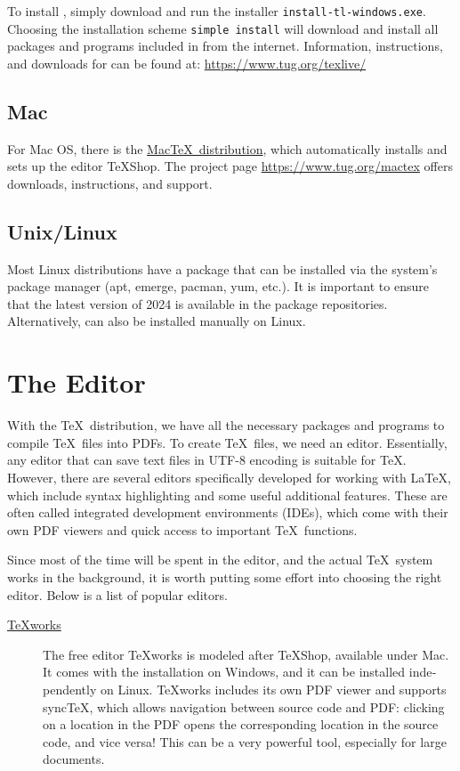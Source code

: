 \documentclass[
	ausgabe=2024-01-13,
	titel=Installation\ Instructions,
	shortverb=true,
	englisch=true,
]{../tex/latexkurs-exercise}
\begin{document}
\begin{english}
To install \TeXlive, simply download and run the installer \texttt{install-tl-windows.exe}. Choosing the installation scheme \texttt{simple install} will download and install all packages and programs included in \TeXlive from the internet. Information, instructions, and downloads for \TeXlive can be found at: \url{https://www.tug.org/texlive/}

\subsection*{Mac}
For Mac OS, there is the \href{https://www.tug.org/mactex}{Mac\TeX\ distribution}, which automatically installs \TeXlive and sets up the editor TeXShop. The project page \url{https://www.tug.org/mactex} offers downloads, instructions, and support.

\subsection*{Unix/Linux}
Most Linux distributions have a \TeXlive package that can be installed via the system's package manager (apt, emerge, pacman, yum, etc.). It is important to ensure that the latest version of 2024 is available in the package repositories. Alternatively, \TeXlive can also be installed manually on Linux.




\clearpage

\section{The Editor}

With the \TeX\ distribution, we have all the necessary packages and programs to compile \TeX\ files into PDFs. To create \TeX\ files, we need an editor. Essentially, any editor that can save text files in UTF-8 encoding is suitable for \TeX. However, there are several editors specifically developed for working with \LaTeX, which include syntax highlighting and some useful additional features. These are often called integrated development environments (IDEs), which come with their own PDF viewers and quick access to important \TeX\ functions.

Since most of the time will be spent in the editor, and the actual \TeX\ system works in the background, it is worth putting some effort into choosing the right editor. Below is a list of popular editors.

\begin{description}
\item[\href{https://www.tug.org/texworks/}{TeXworks}]
The free editor TeXworks is modeled after TeXShop, available under Mac. It comes with the \TeXlive installation on Windows, and it can be installed independently on Linux. TeXworks includes its own PDF viewer and supports sync\TeX, which allows navigation between source code and PDF: clicking on a location in the PDF opens the corresponding location in the source code, and vice versa! This can be a very powerful tool, especially for large documents.


\end{description}
\end{english}
\end{document}
